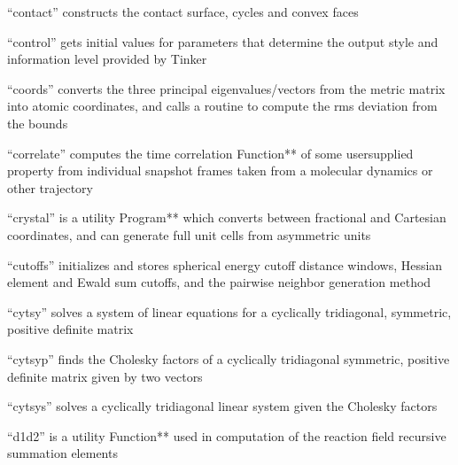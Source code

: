 \documentclass[letterpaper,11pt,english]{sphinxmanual}
\begin{document}
“contact” constructs the contact surface, cycles and convex faces


“control” gets initial values for parameters that determine the output style and information level provided by Tinker


“coords” converts the three principal eigenvalues/vectors from the metric matrix into atomic coordinates, and calls a routine to compute the rms deviation from the bounds


“correlate” computes the time correlation Function** of some user\sphinxhyphen{}supplied property from individual snapshot frames taken from a molecular dynamics or other trajectory






“crystal” is a utility Program** which converts between fractional and Cartesian coordinates, and can generate full unit cells from asymmetric units


“cutoffs” initializes and stores spherical energy cutoff distance windows, Hessian element and Ewald sum cutoffs, and the pairwise neighbor generation method


“cytsy” solves a system of linear equations for a cyclically tridiagonal, symmetric, positive definite matrix


“cytsyp” finds the Cholesky factors of a cyclically tridiagonal symmetric, positive definite matrix given by two vectors


“cytsys” solves a cyclically tridiagonal linear system given the Cholesky factors


“d1d2” is a utility Function** used in computation of the reaction field recursive summation elements
\end{document}
